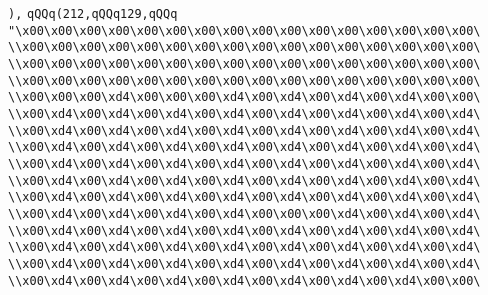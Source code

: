 \verb|),|\newline
\verb|qQQq(212,qQQq129,qQQq|\newline
\verb|"\x00\x00\x00\x00\x00\x00\x00\x00\x00\x00\x00\x00\x00\x00\x00\x00\|\newline
\verb|\\x00\x00\x00\x00\x00\x00\x00\x00\x00\x00\x00\x00\x00\x00\x00\x00\|\newline
\verb|\\x00\x00\x00\x00\x00\x00\x00\x00\x00\x00\x00\x00\x00\x00\x00\x00\|\newline
\verb|\\x00\x00\x00\x00\x00\x00\x00\x00\x00\x00\x00\x00\x00\x00\x00\x00\|\newline
\verb|\\x00\x00\x00\xd4\x00\x00\x00\xd4\x00\xd4\x00\xd4\x00\xd4\x00\x00\|\newline
\verb|\\x00\xd4\x00\xd4\x00\xd4\x00\xd4\x00\xd4\x00\xd4\x00\xd4\x00\xd4\|\newline
\verb|\\x00\xd4\x00\xd4\x00\xd4\x00\xd4\x00\xd4\x00\xd4\x00\xd4\x00\xd4\|\newline
\verb|\\x00\xd4\x00\xd4\x00\xd4\x00\xd4\x00\xd4\x00\xd4\x00\xd4\x00\xd4\|\newline
\verb|\\x00\xd4\x00\xd4\x00\xd4\x00\xd4\x00\xd4\x00\xd4\x00\xd4\x00\xd4\|\newline
\verb|\\x00\xd4\x00\xd4\x00\xd4\x00\xd4\x00\xd4\x00\xd4\x00\xd4\x00\xd4\|\newline
\verb|\\x00\xd4\x00\xd4\x00\xd4\x00\xd4\x00\xd4\x00\xd4\x00\xd4\x00\xd4\|\newline
\verb|\\x00\xd4\x00\xd4\x00\xd4\x00\xd4\x00\x00\x00\xd4\x00\xd4\x00\xd4\|\newline
\verb|\\x00\xd4\x00\xd4\x00\xd4\x00\xd4\x00\xd4\x00\xd4\x00\xd4\x00\xd4\|\newline
\verb|\\x00\xd4\x00\xd4\x00\xd4\x00\xd4\x00\xd4\x00\xd4\x00\xd4\x00\xd4\|\newline
\verb|\\x00\xd4\x00\xd4\x00\xd4\x00\xd4\x00\xd4\x00\xd4\x00\xd4\x00\xd4\|\newline
\verb|\\x00\xd4\x00\xd4\x00\xd4\x00\xd4\x00\xd4\x00\xd4\x00\xd4\x00\x00\|\newline
